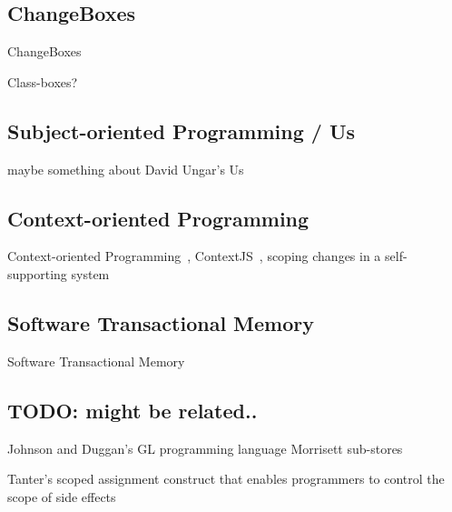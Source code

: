 \subsection{ChangeBoxes}
ChangeBoxes~\cite{Denker2007EEC}

Class-boxes? 


\subsection{Subject-oriented Programming / Us}
maybe something about David Ungar's Us~\cite{}


\subsection{Context-oriented Programming}
Context-oriented Programming~\cite{Hirschfeld2008COP}, ContextJS~\cite{Lincke2011OIC}, scoping changes in a self-supporting system~\cite{Lincke2012SCS}


\subsection{Software Transactional Memory}
Software Transactional Memory~\cite{Shavit1995STM}



\subsection{TODO: might be related..}

Johnson and Duggan’s GL programming language 
Morrisett sub-stores 

Tanter's scoped assignment construct  that enables programmers to control the scope of side effects 

